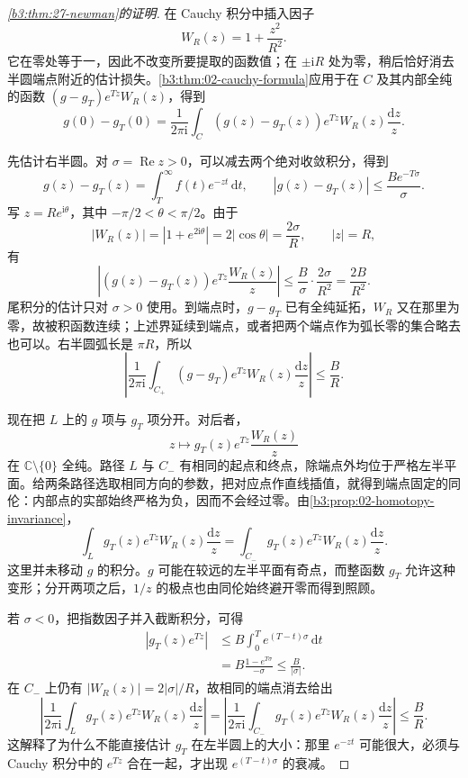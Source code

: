 \begin{proof}[\cref{b3:thm:27-newman}的证明]
在 Cauchy 积分中插入因子
\[
 W_R(z)=1+\frac{z^2}{R^2}.
\]
它在零处等于一，因此不改变所要提取的函数值；在 \(\pm\mathrm iR\) 处为零，稍后恰好消去半圆端点附近的估计损失。\cref{b3:thm:02-cauchy-formula}应用于在 \(C\) 及其内部全纯的函数
\((g-g_T)e^{Tz}W_R(z)\)，得到
\begin{equation}\label{b3:eq:27-newman-contour}
 g(0)-g_T(0)
 =\frac1{2\pi\mathrm i}\int_C
      (g(z)-g_T(z))e^{Tz}W_R(z)\frac{\mathrm dz}{z}.
\end{equation}

先估计右半圆。对 \(\sigma=\operatorname{Re}z>0\)，可以减去两个绝对收敛积分，得到
\[
 g(z)-g_T(z)=\int_T^\infty f(t)e^{-zt}\,\mathrm dt,
 \qquad
 |g(z)-g_T(z)|\le\frac{B e^{-T\sigma}}{\sigma}.
\]
写 \(z=Re^{\mathrm i\theta}\)，其中 \(-\pi/2<\theta<\pi/2\)。由于
\[
 |W_R(z)|=|1+e^{2\mathrm i\theta}|
      =2|\cos\theta|=\frac{2\sigma}{R},
 \qquad |z|=R,
\]
有
\[
 \left|(g(z)-g_T(z))e^{Tz}\frac{W_R(z)}z\right|
 \le \frac{B}{\sigma}\cdot\frac{2\sigma}{R^2}
 =\frac{2B}{R^2}.
\]
尾积分的估计只对 \(\sigma>0\) 使用。到端点时，\(g-g_T\) 已有全纯延拓，\(W_R\) 又在那里为零，故被积函数连续；上述界延续到端点，或者把两个端点作为弧长零的集合略去也可以。右半圆弧长是 \(\pi R\)，所以
\begin{equation}\label{b3:eq:27-newman-right-bound}
 \left|\frac1{2\pi\mathrm i}\int_{C_+}
     (g-g_T)e^{Tz}W_R(z)\frac{\mathrm dz}{z}\right|
 \le\frac BR.
\end{equation}

现在把 \(L\) 上的 \(g\) 项与 \(g_T\) 项分开。对后者，
\[
 z\longmapsto g_T(z)e^{Tz}\frac{W_R(z)}z
\]
在 \(\mathbb C\setminus\{0\}\) 全纯。路径 \(L\) 与 \(C_-\) 有相同的起点和终点，除端点外均位于严格左半平面。给两条路径选取相同方向的参数，把对应点作直线插值，就得到端点固定的同伦：内部点的实部始终严格为负，因而不会经过零。由\cref{b3:prop:02-homotopy-invariance}，
\[
 \int_L g_T(z)e^{Tz}W_R(z)\frac{\mathrm dz}{z}
 =\int_{C_-}g_T(z)e^{Tz}W_R(z)\frac{\mathrm dz}{z}.
\]
这里并未移动 \(g\) 的积分。\(g\) 可能在较远的左半平面有奇点，而整函数 \(g_T\) 允许这种变形；分开两项之后，\(1/z\) 的极点也由同伦始终避开零而得到照顾。

若 \(\sigma<0\)，把指数因子并入截断积分，可得
\[
 \begin{aligned}
 |g_T(z)e^{Tz}|
 &\le B\int_0^T e^{(T-t)\sigma}\,\mathrm dt\\
 &=B\frac{1-e^{T\sigma}}{-\sigma}
 \le\frac B{|\sigma|}.
 \end{aligned}
\]
在 \(C_-\) 上仍有 \(|W_R(z)|=2|\sigma|/R\)，故相同的端点消去给出
\begin{equation}\label{b3:eq:27-newman-left-bound}
 \left|\frac1{2\pi\mathrm i}\int_L
       g_T(z)e^{Tz}W_R(z)\frac{\mathrm dz}{z}\right|
 =\left|\frac1{2\pi\mathrm i}\int_{C_-}
       g_T(z)e^{Tz}W_R(z)\frac{\mathrm dz}{z}\right|
 \le\frac BR.
\end{equation}
这解释了为什么不能直接估计 \(g_T\) 在左半圆上的大小：那里 \(e^{-zt}\) 可能很大，必须与 Cauchy 积分中的 \(e^{Tz}\) 合在一起，才出现 \(e^{(T-t)\sigma}\) 的衰减。


\end{proof}
